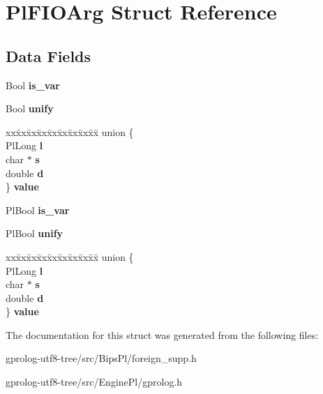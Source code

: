 \hypertarget{structPlFIOArg}{}\section{Pl\+F\+I\+O\+Arg Struct Reference}
\label{structPlFIOArg}
\subsection*{Data Fields}
\begin{DoxyCompactItemize}
\item 
Bool {\bfseries is\+\_\+var}\hypertarget{structPlFIOArg_ad700005317887006bd276a4d1a177881}{}\label{structPlFIOArg_ad700005317887006bd276a4d1a177881}

\item 
Bool {\bfseries unify}\hypertarget{structPlFIOArg_a6394f30ef4d8a74b9a1e731a9f725a35}{}\label{structPlFIOArg_a6394f30ef4d8a74b9a1e731a9f725a35}

\item 
\begin{tabbing}
xx\=xx\=xx\=xx\=xx\=xx\=xx\=xx\=xx\=\kill
union \{\\
\>PlLong {\bfseries l}\\
\>char $\ast$ {\bfseries s}\\
\>double {\bfseries d}\\
\} {\bfseries value}\hypertarget{structPlFIOArg_a69180a58f761dcda790af38c4c0ca5a2}{}\label{structPlFIOArg_a69180a58f761dcda790af38c4c0ca5a2}
\\

\end{tabbing}\item 
Pl\+Bool {\bfseries is\+\_\+var}\hypertarget{structPlFIOArg_ab4d9b51a4575a50e1d9b8a3ec36a3f6e}{}\label{structPlFIOArg_ab4d9b51a4575a50e1d9b8a3ec36a3f6e}

\item 
Pl\+Bool {\bfseries unify}\hypertarget{structPlFIOArg_a3d5c4af7de4d733aa3806b29081336b8}{}\label{structPlFIOArg_a3d5c4af7de4d733aa3806b29081336b8}

\item 
\begin{tabbing}
xx\=xx\=xx\=xx\=xx\=xx\=xx\=xx\=xx\=\kill
union \{\\
\>PlLong {\bfseries l}\\
\>char $\ast$ {\bfseries s}\\
\>double {\bfseries d}\\
\} {\bfseries value}\hypertarget{structPlFIOArg_a1588d26dbc95302b6b7a0b79715ead8e}{}\label{structPlFIOArg_a1588d26dbc95302b6b7a0b79715ead8e}
\\

\end{tabbing}\end{DoxyCompactItemize}


The documentation for this struct was generated from the following files\+:\begin{DoxyCompactItemize}
\item 
gprolog-\/utf8-\/tree/src/\+Bips\+Pl/foreign\+\_\+supp.\+h\item 
gprolog-\/utf8-\/tree/src/\+Engine\+Pl/gprolog.\+h\end{DoxyCompactItemize}
